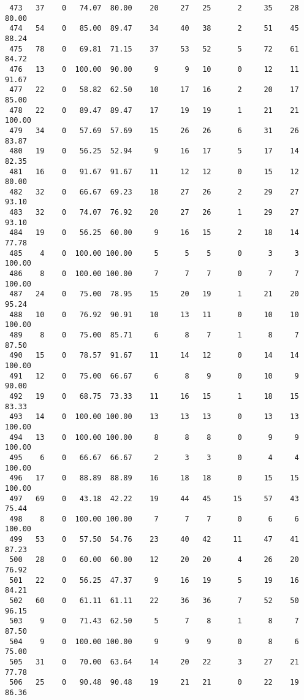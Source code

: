 \begin{verbatim}
 473   37    0   74.07  80.00    20     27   25      2     35    28    80.00
 474   54    0   85.00  89.47    34     40   38      2     51    45    88.24
 475   78    0   69.81  71.15    37     53   52      5     72    61    84.72
 476   13    0  100.00  90.00     9      9   10      0     12    11    91.67
 477   22    0   58.82  62.50    10     17   16      2     20    17    85.00
 478   22    0   89.47  89.47    17     19   19      1     21    21   100.00
 479   34    0   57.69  57.69    15     26   26      6     31    26    83.87
 480   19    0   56.25  52.94     9     16   17      5     17    14    82.35
 481   16    0   91.67  91.67    11     12   12      0     15    12    80.00
 482   32    0   66.67  69.23    18     27   26      2     29    27    93.10
 483   32    0   74.07  76.92    20     27   26      1     29    27    93.10
 484   19    0   56.25  60.00     9     16   15      2     18    14    77.78
 485    4    0  100.00 100.00     5      5    5      0      3     3   100.00
 486    8    0  100.00 100.00     7      7    7      0      7     7   100.00
 487   24    0   75.00  78.95    15     20   19      1     21    20    95.24
 488   10    0   76.92  90.91    10     13   11      0     10    10   100.00
 489    8    0   75.00  85.71     6      8    7      1      8     7    87.50
 490   15    0   78.57  91.67    11     14   12      0     14    14   100.00
 491   12    0   75.00  66.67     6      8    9      0     10     9    90.00
 492   19    0   68.75  73.33    11     16   15      1     18    15    83.33
 493   14    0  100.00 100.00    13     13   13      0     13    13   100.00
 494   13    0  100.00 100.00     8      8    8      0      9     9   100.00
 495    6    0   66.67  66.67     2      3    3      0      4     4   100.00
 496   17    0   88.89  88.89    16     18   18      0     15    15   100.00
 497   69    0   43.18  42.22    19     44   45     15     57    43    75.44
 498    8    0  100.00 100.00     7      7    7      0      6     6   100.00
 499   53    0   57.50  54.76    23     40   42     11     47    41    87.23
 500   28    0   60.00  60.00    12     20   20      4     26    20    76.92
 501   22    0   56.25  47.37     9     16   19      5     19    16    84.21
 502   60    0   61.11  61.11    22     36   36      7     52    50    96.15
 503    9    0   71.43  62.50     5      7    8      1      8     7    87.50
 504    9    0  100.00 100.00     9      9    9      0      8     6    75.00
 505   31    0   70.00  63.64    14     20   22      3     27    21    77.78
 506   25    0   90.48  90.48    19     21   21      0     22    19    86.36

\end{verbatim}
